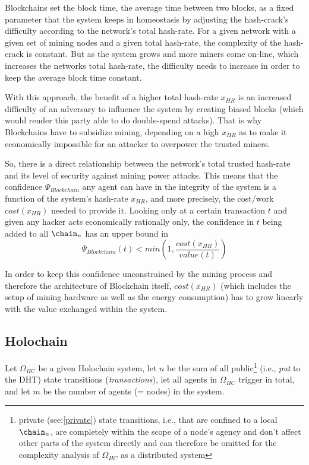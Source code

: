 \documentclass[twocolumn,showpacs,
  nofootinbib,aps,superscriptaddress,
  eqsecnum,prd,notitlepage,showkeys,10pt]{revtex4-1}
\begin{document}
Blockchains set the block time, the average time between two blocks, as a fixed parameter that the system keeps in homeostasis by adjusting the hash-crack's difficulty according to the network's total hash-rate. For a given network with a given set of mining nodes and a given total hash-rate, the complexity of the hash-crack is constant. But as the system grows and more miners come on-line, which increases the networks total hash-rate, the difficulty needs to increase in order to keep the average block time constant.

With this approach, the benefit of a higher total hash-rate $x_{HR}$ is an increased difficulty of an adversary to influence the system by creating biased blocks (which would render this party able to do double-spend attacks). That is why Blockchains have to subsidize mining, depending on a high $x_{HR}$ as to make it economically impossible for an attacker to overpower the trusted miners.

So, there is a direct relationship between the network's total trusted hash-rate and its level of security against mining power attacks.
This means that the confidence $\Psi_{Blockchain}$ any agent can have in the integrity of the system is a function of the system's hash-rate $x_{HR}$, and more precisely, the cost/work $cost(x_{HR})$ needed to provide it.
Looking only at a certain transaction $t$ and given any hacker acts economically rationally only, the confidence in $t$ being added to all $\chain_n$ has an upper bound in
\begin{equation}
\Psi_{Blockchain}(t) < min\left(1, \frac{cost(x_{HR})}{value(t)}\right)
\end{equation}

In order to keep this confidence unconstrained by the mining process and therefore the architecture of Blockchain itself, $cost(x_{HR})$ (which includes the setup of mining hardware as well as the energy consumption) has to grow linearly with the value exchanged within the system.

\subsection{Holochain}
Let $\Omega_{HC}$ be a given Holochain system, let $n$ be the sum of all public\footnote{private (see:\ref{private}) state transitions, i.e., that are confined to a local $\chain_n$, are completely within the scope of a node's agency and don't affect other parts of the system directly and can therefore be omitted for the complexity analysis of $\Omega_{HC}$ as a distributed system} (i.e., \textit{put} to the DHT) state transitions (\textit{transactions}), let all agents in $\Omega_{HC}$ trigger in total, and let $m$ be the number of agents (= nodes) in the system.
\end{document}
